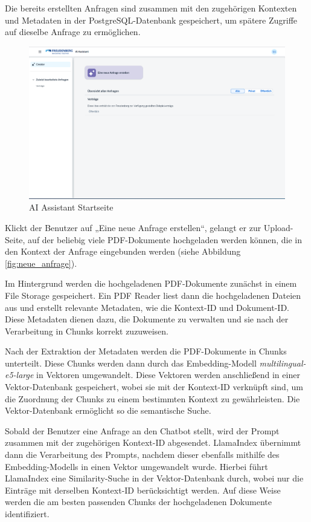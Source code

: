Die bereits erstellten Anfragen sind zusammen mit den zugehörigen Kontexten und Metadaten in der PostgreSQL-Datenbank gespeichert, um spätere Zugriffe auf dieselbe Anfrage zu ermöglichen.

\begin{figure}[H]
    \centering
    \includegraphics[width=1\textwidth]{img/Chatbot_start.png}
    \caption{AI Assistant Startseite}
    \label{fig:chatbot_start}
\end{figure}

Klickt der Benutzer auf „Eine neue Anfrage erstellen“, gelangt er zur Upload-Seite, auf der beliebig viele PDF-Dokumente hochgeladen werden können, 
die in den Kontext der Anfrage eingebunden werden (siehe Abbildung \ref{fig:neue_anfrage}). 

Im Hintergrund werden die hochgeladenen PDF-Dokumente zunächst in einem File Storage gespeichert. Ein PDF Reader liest dann die hochgeladenen Dateien aus und erstellt relevante Metadaten, 
wie die Kontext-ID und Dokument-ID. Diese Metadaten dienen dazu, die Dokumente zu verwalten und sie nach der Verarbeitung in Chunks korrekt zuzuweisen.

Nach der Extraktion der Metadaten werden die PDF-Dokumente in Chunks unterteilt. Diese Chunks werden dann durch das Embedding-Modell \textit{multilingual-e5-large} in Vektoren umgewandelt. 
Diese Vektoren werden anschließend in einer Vektor-Datenbank gespeichert, wobei sie mit der Kontext-ID verknüpft sind, um die Zuordnung der Chunks zu einem bestimmten Kontext zu gewährleisten. 
Die Vektor-Datenbank ermöglicht so die semantische Suche.

Sobald der Benutzer eine Anfrage an den Chatbot stellt, wird der Prompt zusammen mit der zugehörigen Kontext-ID abgesendet. 
LlamaIndex übernimmt dann die Verarbeitung des Prompts, nachdem dieser ebenfalls mithilfe des Embedding-Modells in einen Vektor umgewandelt wurde. 
Hierbei führt LlamaIndex eine Similarity-Suche in der Vektor-Datenbank durch, wobei nur die Einträge mit derselben Kontext-ID berücksichtigt werden. 
Auf diese Weise werden die am besten passenden Chunks der hochgeladenen Dokumente identifiziert.

